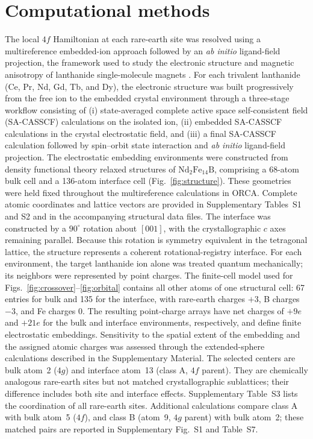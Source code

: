 \documentclass[final,1p,times]{elsarticle}
\DeclareRobustCommand{\rev}[1]{{\color{revcolor}#1}}
\newcommand{\ndfeb}{\mathrm{Nd_2Fe_{14}B}}
\begin{document}
\section{Computational methods}
\rev{The local $4f$ Hamiltonian at each rare-earth site was resolved using a multireference embedded-ion approach followed by an \textit{ab initio} ligand-field projection, the framework used to study the electronic structure and magnetic anisotropy of lanthanide single-molecule magnets \cite{ungur2017,atanasov2012,aravena2016}.} \rev{For each trivalent lanthanide (Ce, Pr, Nd, Gd, Tb, and Dy), the electronic structure was built progressively from the free ion to the embedded crystal environment through a three-stage workflow consisting of (i) state-averaged complete active space self-consistent field (SA-CASSCF) calculations on the isolated ion, (ii) embedded SA-CASSCF calculations in the crystal electrostatic field, and (iii) a final SA-CASSCF calculation followed by spin--orbit state interaction and \textit{ab initio} ligand-field projection.} The electrostatic embedding environments were constructed from density functional theory relaxed structures of $\ndfeb$, comprising a 68-atom bulk cell and a 136-atom interface cell (Fig.~\ref{fig:structure}). These geometries were held fixed throughout the multireference calculations in ORCA. Complete atomic coordinates and lattice vectors are provided in Supplementary Tables~S1 and S2 and in the accompanying structural data files. The interface was constructed by a $90^\circ$ rotation about $[001]$, with the crystallographic $c$ axes remaining parallel. Because this rotation is symmetry equivalent in the tetragonal lattice, the structure represents a coherent rotational-registry interface. \rev{For each environment, the target lanthanide ion alone was treated quantum mechanically; its neighbors were represented by point charges.} \rev{The finite-cell model used for Figs.~\ref{fig:crossover}--\ref{fig:orbital} contains all other atoms of one structural cell: 67 entries for bulk and 135 for the interface, with rare-earth charges $+3$, B charges $-3$, and Fe charges 0.} \rev{The resulting point-charge arrays have net charges of $+9e$ and $+21e$ for the bulk and interface environments, respectively, and define finite electrostatic embeddings. Sensitivity to the spatial extent of the embedding and the assigned atomic charges was assessed through the extended-sphere calculations described in the Supplementary Material.} \rev{The selected centers are bulk atom~2 ($4g$) and interface atom~13 (class A, $4f$ parent).} \rev{They are chemically analogous rare-earth sites but not matched crystallographic sublattices; their difference includes both site and interface effects.} \rev{Supplementary Table~S3 lists the coordination of all rare-earth sites.} \rev{Additional calculations compare class A with bulk atom~5 ($4f$), and class B (atom~9, $4g$ parent) with bulk atom~2; these matched pairs are reported in Supplementary Fig.~S1 and Table~S7.}
\end{document}
